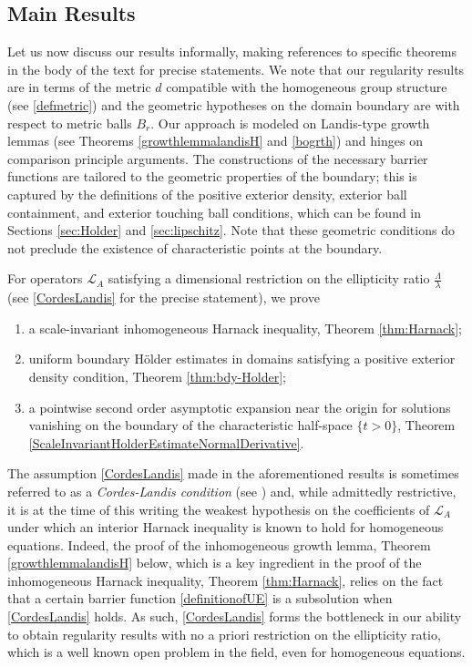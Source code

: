 \documentclass[12pt]{amsart}
\def \L {\mathcal{L}}
\begin{document}
\subsection{Main Results} Let us now discuss our results informally, making references to specific theorems in the body of the text for precise statements. We note that our regularity results are in terms of the metric $d$ compatible with the homogeneous group structure (see \eqref{defmetric}) and the geometric hypotheses on the domain boundary are with respect to metric balls $B_r$. Our approach is modeled on Landis-type growth lemmas (see Theorems \ref{growthlemmalandisH} and \ref{bogrth}) and hinges on comparison principle arguments. The constructions of the necessary barrier functions are tailored to the geometric properties of the boundary; this is captured by the definitions of the positive exterior density, exterior ball containment, and exterior touching ball conditions, which can be found in Sections \ref{sec:Holder} and \ref{sec:lipschitz}. Note that these geometric conditions do not preclude the existence of characteristic points at the boundary. 

For operators $\L_A$ satisfying a dimensional restriction on the ellipticity ratio $\frac{\Lambda}{\lambda}$ (see \eqref{CordesLandis} for the precise statement), we prove
\begin{enumerate}
\item[(i)] a scale-invariant inhomogeneous Harnack inequality, Theorem \ref{thm:Harnack};
\item[(ii)] uniform boundary H\"older estimates in domains satisfying a positive exterior density condition, Theorem \ref{thm:bdy-Holder};
\item[(iii)] a pointwise second order asymptotic expansion near the origin for solutions vanishing on the boundary of the characteristic half-space $\{t > 0\}$, Theorem \ref{ScaleInvariantHolderEstimateNormalDerivative}.
\end{enumerate}

The assumption \eqref{CordesLandis} made in the aforementioned results is sometimes referred to as a \emph{Cordes-Landis condition} (see \cite{T2014}) and, while admittedly restrictive, it is at the time of this writing the weakest hypothesis on the coefficients of $\L_A$ under which an interior Harnack inequality is known to hold for homogeneous equations. Indeed, the proof of the inhomogeneous growth lemma, Theorem \ref{growthlemmalandisH} below, which is a key ingredient in the proof of the inhomogeneous Harnack inequality, Theorem \ref{thm:Harnack}, relies on the fact that a certain barrier function \eqref{definitionofUE} is a subsolution when \eqref{CordesLandis} holds. As such, \eqref{CordesLandis} forms the bottleneck in our ability to obtain regularity results with no a priori restriction on the ellipticity ratio, which is a well known open problem in the field, even for homogeneous equations.
\end{document}
